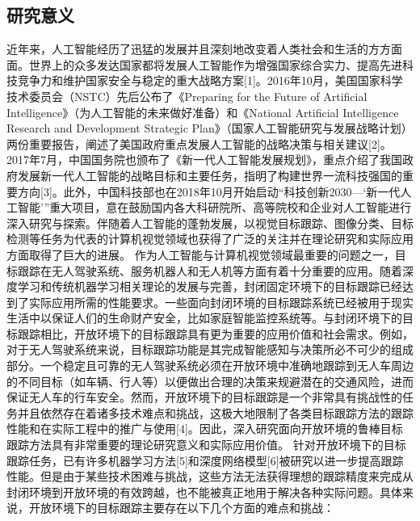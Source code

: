 \documentclass[a4paper,zihao=-4]{article}
\begin{document}
\subsection{研究意义}
近年来，人工智能经历了迅猛的发展并且深刻地改变着人类社会和生活的方方面面。世界上的众多发达国家都将发展人工智能作为增强国家综合实力、提高先进科技竞争力和维护国家安全与稳定的重大战略方案[1]。2016年10月，美国国家科学技术委员会（NSTC）先后公布了《Preparing for the Future of Artificial Intelligence》（为人工智能的未来做好准备）和《National Artificial Intelligence Research and Development Strategic Plan》（国家人工智能研究与发展战略计划）两份重要报告，阐述了美国政府重点发展人工智能的战略决策与相关建议[2]。2017年7月，中国国务院也颁布了《新一代人工智能发展规划》，重点介绍了我国政府发展新一代人工智能的战略目标和主要任务，指明了构建世界一流科技强国的重要方向[3]。此外，中国科技部也在2018年10月开始启动“科技创新2030—‘新一代人工智能’”重大项目，意在鼓励国内各大科研院所、高等院校和企业对人工智能进行深入研究与探索。伴随着人工智能的蓬勃发展，以视觉目标跟踪、图像分类、目标检测等任务为代表的计算机视觉领域也获得了广泛的关注并在理论研究和实际应用方面取得了巨大的进展。
作为人工智能与计算机视觉领域最重要的问题之一，目标跟踪在无人驾驶系统、服务机器人和无人机等方面有着十分重要的应用。随着深度学习和传统机器学习相关理论的发展与完善，封闭固定环境下的目标跟踪已经达到了实际应用所需的性能要求。一些面向封闭环境的目标跟踪系统已经被用于现实生活中以保证人们的生命财产安全，比如家庭智能监控系统等。与封闭环境下的目标跟踪相比，开放环境下的目标跟踪具有更为重要的应用价值和社会需求。例如，对于无人驾驶系统来说，目标跟踪功能是其完成智能感知与决策所必不可少的组成部分。一个稳定且可靠的无人驾驶系统必须在开放环境中准确地跟踪到无人车周边的不同目标（如车辆、行人等）以便做出合理的决策来规避潜在的交通风险，进而保证无人车的行车安全。然而，开放环境下的目标跟踪是一个非常具有挑战性的任务并且依然存在着诸多技术难点和挑战，这极大地限制了各类目标跟踪方法的跟踪性能和在实际工程中的推广与使用[4]。因此，深入研究面向开放环境的鲁棒目标跟踪方法具有非常重要的理论研究意义和实际应用价值。
针对开放环境下的目标跟踪任务，已有许多机器学习方法[5]和深度网络模型[6]被研究以进一步提高跟踪性能。但是由于某些技术困难与挑战，这些方法无法获得理想的跟踪精度来完成从封闭环境到开放环境的有效跨越，也不能被真正地用于解决各种实际问题。具体来说，开放环境下的目标跟踪主要存在以下几个方面的难点和挑战：
\end{document}
